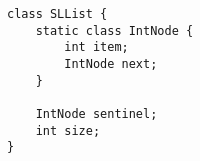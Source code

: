 \begin{lstlisting}
class SLList {
    static class IntNode {
        int item;
        IntNode next;
    }

    IntNode sentinel;
    int size;
}
\end{lstlisting}
